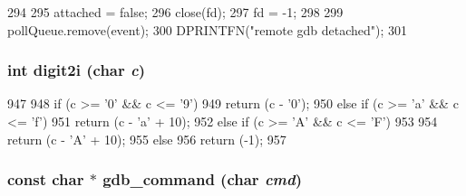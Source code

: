 \begin{DoxyCode}
294 {
295     attached = false;
296     close(fd);
297     fd = -1;
298 
299     pollQueue.remove(event);
300     DPRINTFN("remote gdb detached\n");
301 }
\end{DoxyCode}
\hypertarget{classBaseRemoteGDB_a32f99cfc81ba23dc0b61a0e11373e1da}{
\subsubsection[{digit2i}]{\setlength{\rightskip}{0pt plus 5cm}int digit2i (char {\em c})}}
\label{classBaseRemoteGDB_a32f99cfc81ba23dc0b61a0e11373e1da}



\begin{DoxyCode}
947 {
948     if (c >= '0' && c <= '9')
949         return (c - '0');
950     else if (c >= 'a' && c <= 'f')
951         return (c - 'a' + 10);
952     else if (c >= 'A' && c <= 'F')
953 
954         return (c - 'A' + 10);
955     else
956         return (-1);
957 }
\end{DoxyCode}
\hypertarget{classBaseRemoteGDB_a7bbbec7a5e05f7f9ae638bbe1b72b1d8}{
\subsubsection[{gdb\_\-command}]{\setlength{\rightskip}{0pt plus 5cm}const char $\ast$ gdb\_\-command (char {\em cmd})}}
\label{classBaseRemoteGDB_a7bbbec7a5e05f7f9ae638bbe1b72b1d8}



